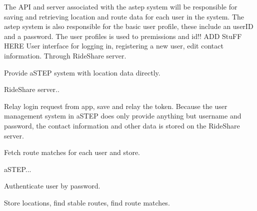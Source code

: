 The API and server associated with the \gls{astep} system will be responsible for saving and retrieving location and route data for each user in the system.
The \gls{astep} system is also responsible for the basic user profile, these include an userID and a password.
The user profiles is used to premissions and id!! ADD StuFF HERE
User interface for logging in, registering a new user, edit contact information.
Through RideShare server.

Provide aSTEP system with location data directly.



RideShare server..

Relay login request from app, save and relay the token.
Because the user management system in aSTEP does only provide anything but username and password, the contact information and other data is stored on the RideShare server.


Fetch route matches for each user and store.



aSTEP...

Authenticate user by password.

Store locations, find stable routes, find route matches.
